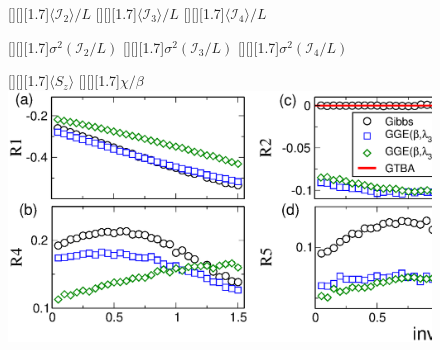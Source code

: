 \documentclass[12pt]{article}
\begin{document}

\begin{figure}
[][][1.7]{$\langle{\mathcal I}_2\rangle/L$}
[][][1.7]{$\langle{\mathcal I}_3\rangle/L$}
[][][1.7]{$\langle{\mathcal I}_4\rangle/L$}

[][][1.7]{$\sigma^2({\mathcal I}_2/L)$}
[][][1.7]{$\sigma^2({\mathcal I}_3/L)$}
[][][1.7]{$\sigma^2({\mathcal I}_4/L)$}

[][][1.7]{$\langle S_z\rangle$}
[][][1.7]{$\chi/\beta$}
\includegraphics{fig1.eps}
\end{figure}
\end{document}

